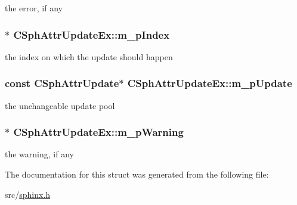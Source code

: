 the error, if any 

\hypertarget{structCSphAttrUpdateEx_ade72d34abff3d2c438aa296e976b3457}{
\subsubsection[{m\-\_\-p\-Index}]{$\ast$ C\-Sph\-Attr\-Update\-Ex\-::m\-\_\-p\-Index}}\label{structCSphAttrUpdateEx_ade72d34abff3d2c438aa296e976b3457}


the index on which the update should happen 

\hypertarget{structCSphAttrUpdateEx_ac15b055c0116e50ef8ebbca6272f2fc6}{
\subsubsection[{m\-\_\-p\-Update}]{\setlength{\rightskip}{0pt plus 5cm}const {\bf C\-Sph\-Attr\-Update}$\ast$ C\-Sph\-Attr\-Update\-Ex\-::m\-\_\-p\-Update}}\label{structCSphAttrUpdateEx_ac15b055c0116e50ef8ebbca6272f2fc6}


the unchangeable update pool 

\hypertarget{structCSphAttrUpdateEx_a498ec6c36647e02d8e6effa8a3b772c4}{
\subsubsection[{m\-\_\-p\-Warning}]{$\ast$ C\-Sph\-Attr\-Update\-Ex\-::m\-\_\-p\-Warning}}\label{structCSphAttrUpdateEx_a498ec6c36647e02d8e6effa8a3b772c4}


the warning, if any 



The documentation for this struct was generated from the following file\-:\begin{DoxyCompactItemize}
\item 
src/\hyperlink{sphinx_8h}{sphinx.\-h}\end{DoxyCompactItemize}
